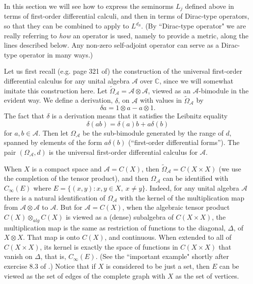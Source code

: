 \documentclass{amsart}[14pt]
\theoremstyle{definition}
\theoremstyle{remark}
\newcommand{\cA}{{\mathcal A}}
\newcommand{\bC}{{\mathbb C}}
\renewcommand{\d}{\delta}
\newcommand{\D}{\Delta}
\renewcommand{\O}{\Omega}
\newcommand{\<}{\langle}
\renewcommand{\>}{\rangle}
\numberwithin{equation}{section}
\begin{document}
{In this section we will see how to express the seminorms $L_j$
defined above
in terms of first-order differential 
calculi, and then in terms of Dirac-type operators,
so that they can be combined to apply to $L^{d_S}$.
(By ``Dirac-type operator" we are really referring to \emph{how}
an operator is used, namely to provide a metric, along the lines
described below. Any non-zero self-adjoint operator
can serve as a Dirac-type operator in many ways.)

Let us first recall (e.g. page 321 of\cite{GVF}) the 
construction of the universal first-order
differential calculus for any unital algebra $\cA$ over $\bC$, since
we will somewhat imitate this construction here.
Let $\tilde\O_\cA = \cA \otimes \cA$, viewed as an $\cA$-bimodule
in the evident way. We define a derivation, $\d$, on $\cA$ 
with values in $\tilde\O_\cA$ by
\[
\d a = 1 \otimes a - a \otimes 1 .
\]
The fact that $\d$ is a derivation means that it satisfies
the Leibnitz equality
\[
\d(ab) = \d(a)b + a \d(b)
\]
for $a,b \in \cA$. Then let $\O_\cA $ be
the sub-bimodule generated by
the range of $d$, spanned by elements of the
form $a\d (b)$ (``first-order differential forms''). The pair $(\O_\cA, d)$ 
is the universal first-order differential calculus for $\cA$.

When $X$ is a compact space and $\cA = C(X)$,
then $\tilde\O_\cA = C(X\times X)$ (we use the completion
of the tensor product), and then $\O_\cA$ can be 
identified with $C_\infty(E)$ where 
$E = \{(x,y): x,y \in X, \ x \neq y\}$. Indeed, for any unital
algebra $\cA$ there is a natural identification of $\O_\cA$
with the kernel of the multiplication map from 
$\cA \otimes \cA$ to $\cA$. But for $\cA = C(X)$, when
the algebraic tensor product $C(X) \otimes _{alg} C(X)$
is viewed as a
(dense) subalgebra of $C(X\times X)$, the multiplication
map is the same as restriction of functions to the diagonal, $\D$,
of $X \otimes X$. That map is onto $C(X)$, and continuous.
When extended to all of $C(X\times X)$, its kernel is exactly
the space of functions in $C(X\times X)$ that vanish on $\D$, 
that is, $C_\infty(E)$. (See the ``important example"
shortly after exercise 8.3 of \cite{GVF}.)
Notice that if $X$
is considered to be just a set, then $E$ can be viewed 
as the set of edges of the complete graph with $X$
as the set of vertices.

}
\end{document}

